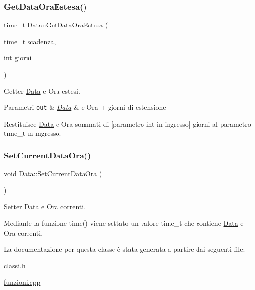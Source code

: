 \subsubsection{\texorpdfstring{Get\+Data\+Ora\+Estesa()}{GetDataOraEstesa()}}
{\footnotesize\ttfamily time\+\_\+t Data\+::\+Get\+Data\+Ora\+Estesa (\begin{DoxyParamCaption}\item[{time\+\_\+t}]{scadenza,  }\item[{int}]{giorni }\end{DoxyParamCaption})}



Getter \mbox{\hyperlink{class_data}{Data}} e Ora estesi. 


\begin{DoxyParams}[1]{Parametri}
\mbox{\tt out}  & {\em \mbox{\hyperlink{class_data}{Data}}} & e Ora + giorni di estensione\\
\hline
\end{DoxyParams}
Restituisce \mbox{\hyperlink{class_data}{Data}} e Ora sommati di \mbox{[}parametro int in ingresso\mbox{]} giorni al parametro time\+\_\+t in ingresso. \mbox{\label{class_data_a0f77e10131654f6588e1ed935c8b5926}} 
\subsubsection{\texorpdfstring{Set\+Current\+Data\+Ora()}{SetCurrentDataOra()}}
{\footnotesize\ttfamily void Data\+::\+Set\+Current\+Data\+Ora (\begin{DoxyParamCaption}{ }\end{DoxyParamCaption})}



Setter \mbox{\hyperlink{class_data}{Data}} e Ora correnti. 

Mediante la funzione time() viene settato un valore time\+\_\+t che contiene \mbox{\hyperlink{class_data}{Data}} e Ora correnti. 

La documentazione per questa classe è stata generata a partire dai seguenti file\+:\begin{DoxyCompactItemize}
\item 
\mbox{\hyperlink{classi_8h}{classi.\+h}}\item 
\mbox{\hyperlink{funzioni_8cpp}{funzioni.\+cpp}}\end{DoxyCompactItemize}
